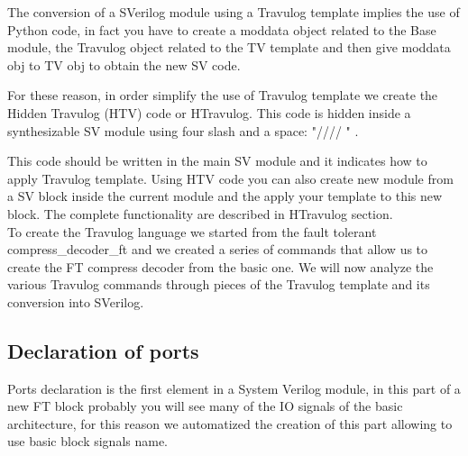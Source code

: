 {{        The conversion of a SVerilog module using a Travulog template implies the use of Python code, in fact you have to create a moddata object related to the Base module, the Travulog object related to the TV template and then give moddata obj to TV obj to obtain the new SV code.	
        
        For these reason, in order simplify the use of Travulog template we create the Hidden Travulog (HTV) code or HTravulog. This code is hidden inside a synthesizable SV module using four slash and a space: "//// " . 
        
        This code should be written in the main SV module and it indicates how to apply Travulog template. Using HTV code you can also create new module from a SV block inside the current module and the apply your template to this new block. The complete functionality are described in HTravulog section. \\
	
	
    	To create the Travulog language we started from the fault tolerant 
    	compress\_decoder\_ft and we created a series of commands that allow us to create the FT compress decoder from the basic one. We will now analyze the various Travulog commands through pieces of the Travulog template and its conversion into SVerilog.
	
	
    	\subsection{Declaration of ports}{
    		Ports declaration is the first element in a System Verilog module, in this part of a new FT block probably you will see many of the IO signals of the basic architecture, for this reason we automatized the creation of this part allowing to use basic block signals name.\\
    		
}}}
